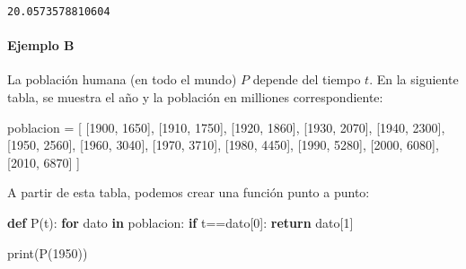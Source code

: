 \documentclass[
]{article}
\newenvironment{Shaded}{}{}
\newcommand{\BuiltInTok}[1]{#1}
\newcommand{\ControlFlowTok}[1]{\textcolor[rgb]{0.00,0.44,0.13}{\textbf{#1}}}
\newcommand{\DecValTok}[1]{\textcolor[rgb]{0.25,0.63,0.44}{#1}}
\newcommand{\KeywordTok}[1]{\textcolor[rgb]{0.00,0.44,0.13}{\textbf{#1}}}
\newcommand{\NormalTok}[1]{#1}
\newcommand{\OperatorTok}[1]{\textcolor[rgb]{0.40,0.40,0.40}{#1}}
\begin{document}
\begin{verbatim}
20.0573578810604
\end{verbatim}

\hypertarget{ejemplo-b}{%
\paragraph{Ejemplo B}\label{ejemplo-b}}

La población humana (en todo el mundo) \(P\) depende del tiempo \(t\).
En la siguiente tabla, se muestra el año y la población en milliones
correspondiente:

\begin{Shaded}
\begin{Highlighting}[]
\NormalTok{poblacion }\OperatorTok{=}\NormalTok{ [}
\NormalTok{    [}\DecValTok{1900}\NormalTok{, }\DecValTok{1650}\NormalTok{],}
\NormalTok{    [}\DecValTok{1910}\NormalTok{, }\DecValTok{1750}\NormalTok{],}
\NormalTok{    [}\DecValTok{1920}\NormalTok{, }\DecValTok{1860}\NormalTok{],}
\NormalTok{    [}\DecValTok{1930}\NormalTok{, }\DecValTok{2070}\NormalTok{],}
\NormalTok{    [}\DecValTok{1940}\NormalTok{, }\DecValTok{2300}\NormalTok{],}
\NormalTok{    [}\DecValTok{1950}\NormalTok{, }\DecValTok{2560}\NormalTok{],}
\NormalTok{    [}\DecValTok{1960}\NormalTok{, }\DecValTok{3040}\NormalTok{],}
\NormalTok{    [}\DecValTok{1970}\NormalTok{, }\DecValTok{3710}\NormalTok{],}
\NormalTok{    [}\DecValTok{1980}\NormalTok{, }\DecValTok{4450}\NormalTok{],}
\NormalTok{    [}\DecValTok{1990}\NormalTok{, }\DecValTok{5280}\NormalTok{],}
\NormalTok{    [}\DecValTok{2000}\NormalTok{, }\DecValTok{6080}\NormalTok{],}
\NormalTok{    [}\DecValTok{2010}\NormalTok{, }\DecValTok{6870}\NormalTok{]}
\NormalTok{            ]}
\end{Highlighting}
\end{Shaded}

A partir de esta tabla, podemos crear una función punto a punto:

\begin{Shaded}
\begin{Highlighting}[]
\KeywordTok{def}\NormalTok{ P(t):}
    \ControlFlowTok{for}\NormalTok{ dato }\KeywordTok{in}\NormalTok{ poblacion:}
        \ControlFlowTok{if}\NormalTok{ t}\OperatorTok{==}\NormalTok{dato[}\DecValTok{0}\NormalTok{]:}
            \ControlFlowTok{return}\NormalTok{ dato[}\DecValTok{1}\NormalTok{]}
        
\BuiltInTok{print}\NormalTok{(P(}\DecValTok{1950}\NormalTok{))}
\end{Highlighting}
\end{Shaded}
\end{document}
